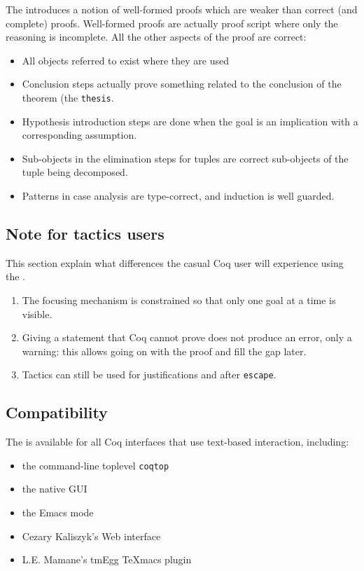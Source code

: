 The \DPL{} introduces a notion of well-formed
proofs which are weaker than correct (and complete)
proofs. Well-formed proofs are actually proof script where only the
reasoning is incomplete. All the other aspects of the proof are
correct:
\begin{itemize}
\item All objects referred to exist where they are used
\item Conclusion steps actually prove something related to the
  conclusion of the theorem (the {\tt thesis}.
\item Hypothesis introduction steps are done when the goal is an
  implication with a corresponding assumption.
\item Sub-objects in the elimination steps for tuples are correct
  sub-objects of the tuple being decomposed.
\item Patterns in case analysis are type-correct, and induction is well guarded.
\end{itemize}

\subsection{Note for tactics users}

This section explain what differences the casual Coq user will
experience using the \DPL.
\begin{enumerate}
\item The focusing mechanism is constrained so that only one goal at
  a time is visible.
\item Giving a statement that Coq cannot prove does not produce an
  error, only a warning: this allows going on with the proof and fill
  the gap later.
\item Tactics can still be used for justifications and after
{\texttt{escape}}.
\end{enumerate}

\subsection{Compatibility}

The \DPL{} is available for all Coq interfaces that use
text-based interaction, including:
\begin{itemize}
\item the command-{}line toplevel {\texttt{coqtop}}
\item the native GUI {\CoqIDE}
\item the {\ProofGeneral} Emacs mode
\item Cezary Kaliszyk'{}s Web interface
\item L.E. Mamane'{}s tmEgg TeXmacs plugin
\end{itemize}

